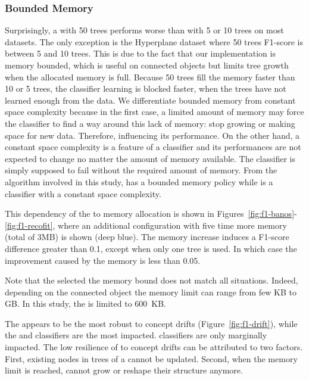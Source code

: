 \subsubsection{Bounded Memory}
Surprisingly, a \mondrianforest with 50 trees performs worse than with 5 or 10
trees on most datasets. The only exception is the Hyperplane dataset where
50 trees F1-score is between 5 and 10 trees. This is due to the fact that
our \mondrianforest implementation is memory bounded, which is
useful on connected objects but limits tree growth when the allocated memory is
full. Because 50 trees fill the memory faster than 10 or 5 trees, the
classifier learning is blocked faster, when the trees have not learned enough
from the data.
We differentiate bounded memory from constant space complexity because in the
first case, a limited amount of memory may force the classifier to find a way
around this lack of memory: stop growing or making space for new data.
Therefore, influencing its performance.  On the other hand, a constant space
complexity is a feature of a classifier and its performances are not expected
to change no  matter the amount of memory available. The classifier is simply
supposed to fail without the required amount of memory. From the algorithm
involved in this study, \mondrianforest has a bounded memory policy while
\naivebayes is a classifier with a constant space complexity.

This dependency of the \mondrianforest to memory allocation is shown in
Figures~\ref{fig:f1-banos}-\ref{fig:f1-recofit}, where an additional
configuration with five time more memory (total of 3MB) is shown (deep blue).  The memory
increase induces a F1-score difference greater than 0.1, except when only one
tree is used. In which case the improvement caused by the memory is less than
0.05.

Note that the selected the memory bound does not match all situations. Indeed,
depending on the connected object the memory limit can range from few KB to GB.
In this study, the \mondrianforest is limited to 600~KB.

The \hoeffdingtree appears to be the most robust to concept drifts
(Figure~\ref{fig:f1-drift}), while the \mondrianforest and \naivebayes
classifiers are the most impacted. \mcnn classifiers are only marginally impacted.
The low resilience of \mondrianforest to concept drifts can be attributed to
two factors. First, existing nodes in trees of a \mondrianforest cannot be updated.
Second, when the memory limit is reached, \mondrianforest cannot grow
or reshape their structure anymore.

